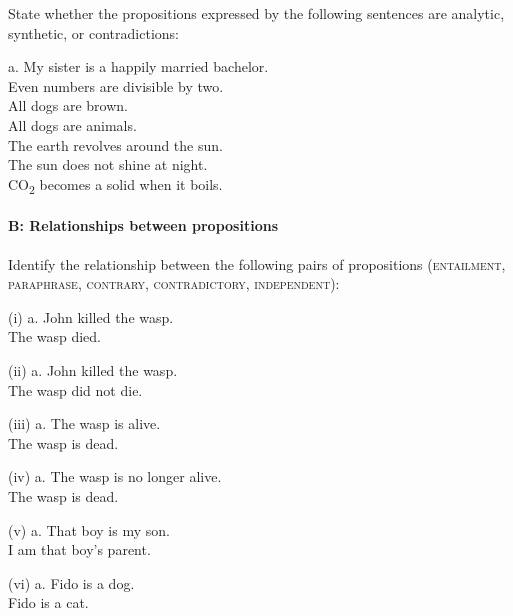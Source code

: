 State whether the propositions expressed by the following sentences are analytic, synthetic, or contradictions:

\ea
  a. My sister is a happily married bachelor.\\
\ex Even numbers are divisible by two.\\
\ex All dogs are brown.\\
\ex All dogs are animals.\\
\ex The earth revolves around the sun.\\
\ex The sun does not shine at night.\\
\ex CO\textsubscript{2} becomes a solid when it boils.
\z

\paragraph*{B: Relationships between propositions}

Identify the relationship between the following pairs of propositions (\textsc{entailment, paraphrase, contrary,} \textsc{contradictory,} \textsc{independent}):

\begin{stylepoints}
(i)  a. John killed the wasp.\\
\ex The wasp died.
\end{stylepoints}

\begin{stylepoints}
(ii)  a. John killed the wasp.\\
\ex The wasp did not die.
\end{stylepoints}

\begin{stylepoints}
(iii)  a. The wasp is alive.\\
\ex The wasp is dead.
\end{stylepoints}

\begin{stylepoints}
(iv)  a. The wasp is no longer alive.\\
\ex The wasp is dead.
\end{stylepoints}

\begin{stylepoints}
(v)  a. That boy is my son.\\
\ex I am that boy’s parent.
\end{stylepoints}

\begin{stylepoints}
(vi)  a. Fido is a dog.\\
\ex Fido is a cat.
\end{stylepoints}

